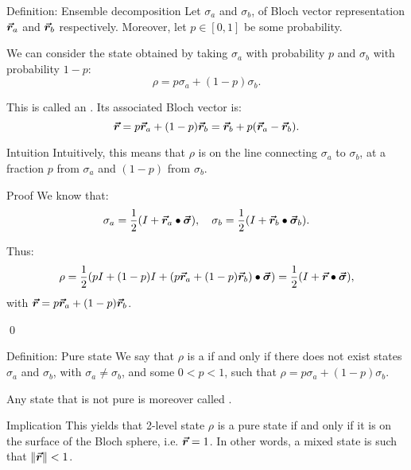 \documentclass[a4paper]{article}
\begin{document}
\begin{parag}{Definition: Ensemble decomposition}
    Let $\sigma_a$ and $\sigma_b$, of Bloch vector representation $\bm{\protect\vec{r}}_a$ and $\bm{\protect\vec{r}}_b$ respectively. Moreover, let $p \in \left[0, 1\right]$ be some probability.

    We can consider the state obtained by taking $\sigma_a$ with probability $p$ and $\sigma_b$ with probability $1-p$: 
    \[\rho = p \sigma_a + \left(1-p\right) \sigma_b.\]
    
    This is called an . Its associated Bloch vector is: 
    \[\bvec{r} = p \bvec{r}_a + \left(1-p\right) \bvec{r}_b = \bvec{r}_b + p \left(\bvec{r}_a - \bvec{r}_b\right).\]
    
    \begin{subparag}{Intuition}
        Intuitively, this means that $\rho$ is on the line connecting $\sigma_a$ to $\sigma_b$, at a fraction $p$ from $\sigma_a$ and $\left(1-p\right)$ from $\sigma_b$. 
    \end{subparag}

    \begin{subparag}{Proof}
        We know that: 
        \[\sigma_a = \frac{1}{2}\left(I + \bvec{r}_a \dotprod \bvec{\sigma}\right), \mathspace \sigma_b = \frac{1}{2} \left(I + \bvec{r}_b \dotprod \bvec{\sigma}_b\right).\]

        Thus: 
        \[\rho = \frac{1}{2}\left(pI + \left(1-p\right)I + \left(p \bvec{r}_a + \left(1-p\right)\bvec{r}_b\right)\dotprod \bvec{\sigma}\right) = \frac{1}{2}\left(I + \bvec{r} \dotprod \bvec{\sigma}\right),\]
        with $\bvec{r} = p \bvec{r}_a + \left(1-p\right)\bvec{r}_b$.

        \qed
    \end{subparag}
\end{parag}

\begin{parag}{Definition: Pure state}
    We say that $\rho$ is a  if and only if there does not exist states $\sigma_a$ and $\sigma_b$, with $\sigma_a \neq \sigma_b$, and some $0 < p < 1$, such that $\rho = p \sigma_a + \left(1 - p\right) \sigma_b$.

    Any state that is not pure is moreover called .

    \begin{subparag}{Implication}
        This yields that 2-level state $\rho$ is a pure state if and only if it is on the surface of the Bloch sphere, i.e. $\bm{\protect\vec{r}} = 1$. In other words, a mixed state is such that $\left\|\bvec{r}\right\| < 1$.
    \end{subparag}
\end{parag}
\end{document}

